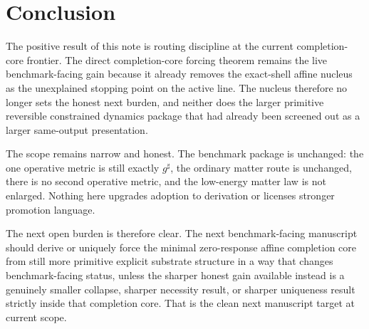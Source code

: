 \documentclass[11pt]{article}
\newcommand{\CompletedMetric}{g^{\sharp}}
\begin{document}
\section{Conclusion}

The positive result of this note is routing discipline at the current completion-core frontier. The direct completion-core forcing theorem remains the live benchmark-facing gain because it already removes the exact-shell affine nucleus as the unexplained stopping point on the active line. The nucleus therefore no longer sets the honest next burden, and neither does the larger primitive reversible constrained dynamics package that had already been screened out as a larger same-output presentation.

The scope remains narrow and honest. The benchmark package is unchanged: the one operative metric is still exactly \(\CompletedMetric\), the ordinary matter route is unchanged, there is no second operative metric, and the low-energy matter law is not enlarged. Nothing here upgrades adoption to derivation or licenses stronger promotion language.

The next open burden is therefore clear. The next benchmark-facing manuscript should derive or uniquely force the minimal zero-response affine completion core from still more primitive explicit substrate structure in a way that changes benchmark-facing status, unless the sharper honest gain available instead is a genuinely smaller collapse, sharper necessity result, or sharper uniqueness result strictly inside that completion core. That is the clean next manuscript target at current scope.
\end{document}
